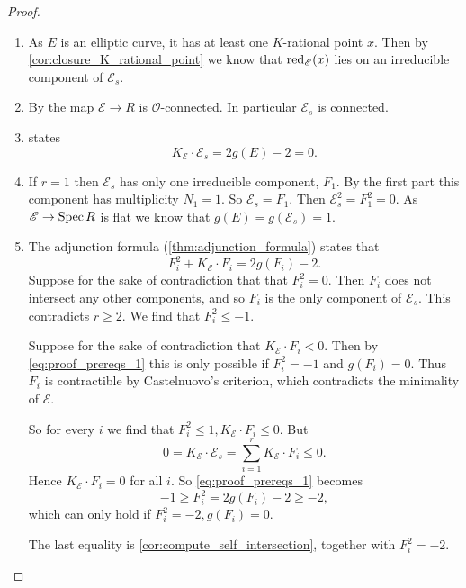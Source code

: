 \begin{proof}
\begin{enumerate}
	\item As $E$ is an elliptic curve, it has at least one $K$-rational point $x$.
		Then by \cref{cor:closure_K_rational_point} we know that  $\operatorname{red}_{\mathscr E}(x)$ lies on an irreducible component of $\mathscr E_s$. 
	\item By \cite[cor.\ 9.1.24]{liuAlgebraicGeometryArithmetic2002} the map $\mathscr E \to R$ is $\mathcal{O}$-connected. 
		In particular  $\mathscr E_s$ is connected. 
	\item {} states \[
			K_{\mathscr E} \cdot \mathscr E_{s} = 2g(E) - 2 = 0
	.\]  
	\item If $r = 1$ then $\mathscr E_s$ has only one irreducible component, $F_1$. 
		By the first part this component has multiplicity $N_1 = 1$. 
		So $\mathscr E_s = F_1$. 
		Then $\mathscr E_s^2 = F_1^2 = 0$. 
		As $\mathscr E \to \operatorname{Spec} R$ is flat we know that $g(E)  = g(\mathscr E_s) = 1$.
	\item 	
		The adjunction formula (\cref{thm:adjunction_formula}) states that \begin{equation}\label{eq:proof_prereqs_1}
			F_i^2 + K_{\mathscr E} \cdot F_i = 2g(F_i) - 2
		.\end{equation}
		Suppose for the sake of contradiction that that $F_i^2 = 0$. 
		Then $F_i$ does not intersect any other components, and so $F_i$ is the only component of $\mathscr E_s$. 
		This contradicts $r \ge 2$. 
		We find that $F_i^2 \le -1$. 
		
		Suppose for the sake of contradiction that $K_\mathscr E \cdot F_i < 0$. 
		Then by \eqref{eq:proof_prereqs_1} this is only possible if $F_i^2 = -1$ and $g(F_i) =0$. 
		Thus $F_i$ is contractible by Castelnuovo's criterion, which contradicts the minimality of $\mathscr E$. 

		So for every $i$ we find that $F_i^2 \le 1, K_{\mathscr E} \cdot F_i \le 0$. 
		But \[
		0 = K_{\mathscr E} \cdot \mathscr E_s = \sum_{i = 1}^{r} K_{\mathscr E} \cdot F_i \le 0
		.\]  
		Hence  $K_{\mathscr E} \cdot F_i = 0$ for all $i$. 
		So \eqref{eq:proof_prereqs_1} becomes \[
			-1 \ge  F^2_i = 2g(F_i) - 2 \ge -2
		,\]  
		which can only hold if $F_i^2 = -2, g(F_i) = 0$. 

		The last equality is \cref{cor:compute_self_intersection}, together with $F_i^2 = -2$. 
\end{enumerate}	
\end{proof}

